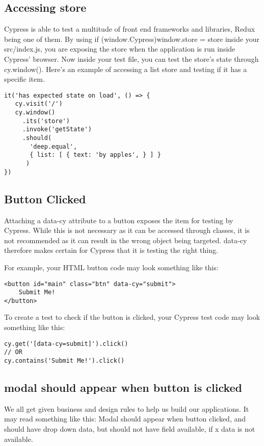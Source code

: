 \subsection{ Accessing store }
Cypress is able to test a multitude of front end frameworks and libraries,
Redux being one of them. By using if (window.Cypress){window.store = store }
inside your src/index.js, you are exposing the store when the application is
run inside Cypress' browser. Now inside your test file, you can test the store's
state through cy.window(). Here's an example of accessing a list store and
testing if it has a specific item.

\begin{lstlisting}
it('has expected state on load', () => {
   cy.visit('/')
   cy.window()
     .its('store')
     .invoke('getState')
     .should(
       'deep.equal',
       { list: [ { text: 'by apples', } ] }
      )
})
\end{lstlisting}

\subsection{ Button Clicked }
Attaching a data-cy attribute to a button exposes the item for testing by
Cypress. While this is not necessary as it can be accessed through classes, it
is not recommended as it can result in the wrong object being targeted. data-cy
therefore makes certain for Cypress that it is testing the right thing.

For example, your HTML button code may look something like this:

\begin{verbatim}
<button id="main" class="btn" data-cy="submit">
    Submit Me!
</button>
\end{verbatim}

To create a test to check if the button is clicked, your Cypress test code may
look something like this:

\begin{verbatim}
cy.get('[data-cy=submit]').click()
// OR
cy.contains('Submit Me!').click()
\end{verbatim}

\subsection{ modal should appear when button is clicked }
We all get given business and design rules to help us build our applications.
It may read something like this:
Modal should appear when button clicked, and should have drop down data, but
should not have field available, if x data is not available.

